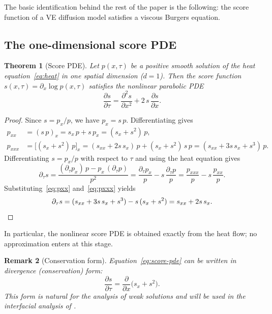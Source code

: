 \documentclass[11pt]{article}
\newtheorem{theorem}{Theorem}[section]
\newtheorem{remark}[theorem]{Remark}
\begin{document}
The basic identification behind the rest of the paper is the following: the score function of a VE diffusion model satisfies a viscous Burgers equation.

\subsection{The one-dimensional score PDE}\label{sec:sb:1d}

\begin{theorem}[Score PDE]\label{thm:score-pde}
Let $p(x,\tau)$ be a positive smooth solution of the heat equation~\eqref{eq:heat} in one spatial dimension ($d=1$).
Then the score function $s(x,\tau) = \partial_x \log p(x,\tau)$ satisfies the nonlinear parabolic PDE
\begin{equation}\label{eq:score-pde}
  \frac{\partial s}{\partial \tau}
  = \frac{\partial^2 s}{\partial x^2}
    + 2\,s\,\frac{\partial s}{\partial x}.
\end{equation}
\end{theorem}

\begin{proof}
Since $s = p_x / p$, we have $p_x = s\,p$. Differentiating gives
\begin{align}
  p_{xx}
  &= (s\,p)_x
   = s_x\,p + s\,p_x
   = (s_x + s^2)\,p,\label{eq:pxx}\\[4pt]
  p_{xxx}
  &= \bigl[(s_x + s^2)\,p\bigr]_x
   = (s_{xx} + 2s\,s_x)\,p + (s_x + s^2)\,s\,p
   = (s_{xx} + 3s\,s_x + s^3)\,p.\label{eq:pxxx}
\end{align}
Differentiating $s = p_x / p$ with respect to $\tau$ and using the heat equation gives
\begin{equation}\label{eq:s-tau-quotient}
  \partial_\tau s
  = \frac{(\partial_\tau p_x)\,p - p_x\,(\partial_\tau p)}{p^2}
  = \frac{\partial_\tau p_x}{p} - s\,\frac{\partial_\tau p}{p}
  = \frac{p_{xxx}}{p} - s\,\frac{p_{xx}}{p}.
\end{equation}
Substituting~\eqref{eq:pxx} and~\eqref{eq:pxxx} yields
\begin{equation}\label{eq:s-tau-expand}
  \partial_\tau s
  = (s_{xx} + 3s\,s_x + s^3) - s\,(s_x + s^2)
  = s_{xx} + 2s\,s_x. \qedhere
\end{equation}
\end{proof}

In particular, the nonlinear score PDE is obtained exactly from the heat flow; no approximation enters at this stage.

\begin{remark}[Conservation form]\label{rem:conservation}
Equation~\eqref{eq:score-pde} can be written in divergence (conservation) form:
\begin{equation}\label{eq:score-conservation}
  \frac{\partial s}{\partial \tau}
  = \frac{\partial}{\partial x}\!\bigl(s_x + s^2\bigr).
\end{equation}
This form is natural for the analysis of weak solutions and will be used in the interfacial analysis of .
\end{remark}
\end{document}
